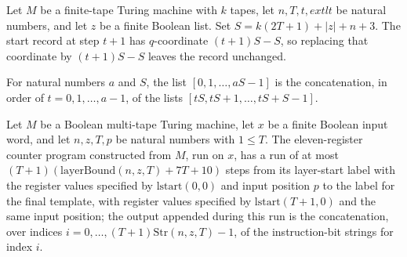 \begin{theorem}
\label{Complexity.UTab.lstart_succ}
\leanok
{}
Let $M$ be a finite-tape Turing machine with $k$ tapes, let $n,T,t,	ext{lt}$ be natural
numbers, and let $z$ be a finite Boolean list. Set $S=k(2T+1)+|z|+n+3$. The start record
at step $t+1$ has $q$-coordinate $(t+1)S-S$, so replacing that coordinate by $(t+1)S-S$
leaves the record unchanged.
\end{theorem}

\begin{theorem}
\label{Complexity.UTab.range_mul}
\leanok
{}
For natural numbers $a$ and $S$, the list $[0,1,\ldots,aS-1]$ is the concatenation, in
order of $t=0,1,\ldots,a-1$, of the lists $[tS,tS+1,\ldots,tS+S-1]$.
\end{theorem}

\begin{theorem}
\label{Complexity.UTab.goes_layers}
\leanok
{}
Let $M$ be a Boolean multi-tape Turing machine, let $x$ be a finite Boolean input word,
and let $n,z,T,p$ be natural numbers with $1\le T$. The eleven-register counter program
constructed from $M$, run on $x$, has a run of at most
$(T+1)(\mathrm{layerBound}(n,z,T)+7T+10)$ steps from its layer-start label with the
register values specified by $\mathrm{lstart}(0,0)$ and input position $p$ to the label
for the final template, with register values specified by $\mathrm{lstart}(T+1,0)$ and
the same input position; the output appended during this run is the concatenation, over
indices $i=0,\ldots,(T+1)\mathrm{Str}(n,z,T)-1$, of the instruction-bit strings for
index $i$.
\end{theorem}
